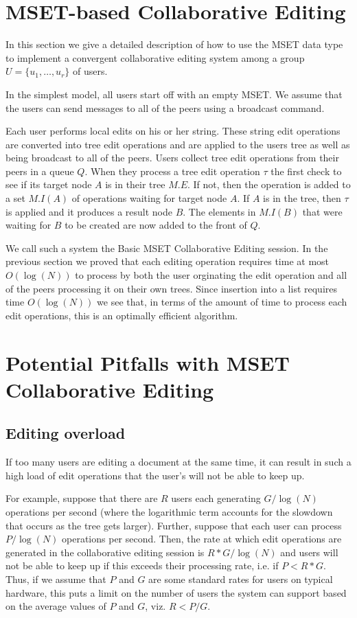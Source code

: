 \documentclass{amsart}
\begin{document}
\section{MSET-based Collaborative Editing}

In this section we give a detailed description of how to use the MSET data type to implement a convergent collaborative editing system among a group $U = \{u_1,\ldots,u_r\}$ of users.

In the simplest model, all users start off with an empty MSET. We assume that the users can send messages to all of the peers using a broadcast command. 

Each user performs local edits on his or her string. These string edit operations are converted into tree edit operations and are applied to the users tree as well as being broadcast to all of the peers.  Users collect tree edit operations from their peers in a queue $Q$. When they process a tree edit operation $\tau$ the first check to see if its target node $A$ is in their tree $M.E$.  If not, then the operation is added to a set $M.I(A)$ of operations waiting for target node $A$.  If $A$ is in the tree, then $\tau$ is applied and it produces a result node $B$. The elements in $M.I(B)$ that were waiting for $B$ to be created are now added to the front of $Q$.

We call such a system the Basic MSET Collaborative Editing session. In the previous section we proved that each editing operation requires time at most $O(\log(N))$ to process by both the user orginating the edit operation and all of the peers processing it on their own trees.  Since insertion into a list requires time $O(\log(N))$ we see that, in terms of the amount of time to process each edit operations, this is an optimally efficient algorithm.

\section{Potential Pitfalls with MSET Collaborative Editing}

\subsection{Editing overload}
If too many users are editing a document at the same time, it can result in such a high load of edit operations that the user's will not be able to keep up.

For example, suppose that there are $R$ users each generating $G/\log(N)$ operations per second (where the logarithmic term accounts for the slowdown that occurs as the tree gets larger). Further, suppose that each user can process $P/\log(N)$ operations per second. Then, the rate at which edit operations are generated in the collaborative editing session is $R*G/\log(N)$ and users will
not be able to keep up if this exceeds their processing rate, i.e. if $P<R*G$.
Thus, if we assume that $P$ and $G$ are some standard rates for users on
typical hardware, this puts a limit on the number of users the system can support based on the average values of $P$ and $G$, viz. $R < P/G$.
\end{document}
